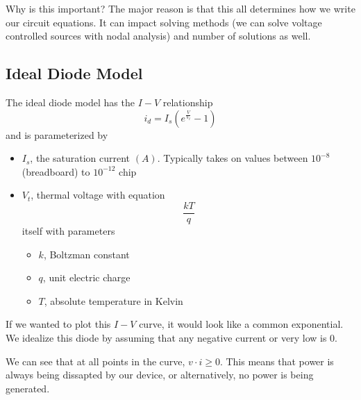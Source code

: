 \documentclass{report}
\begin{document}
Why is this important? The major reason is that this all determines how we write our circuit equations. It can impact solving methods (we can solve voltage controlled sources with nodal analysis) and number of solutions as well.

\subsection{Ideal Diode Model}
The ideal diode model has the $I-V$ relationship
\begin{equation*}
    i_d = I_s (e^{\frac{V}{V_t}} - 1)
\end{equation*}
and is parameterized by
\begin{itemize}
    \item $I_s$, the saturation current $(A)$. Typically takes on values between $10^{-8}$ (breadboard) to $10^{-12}$ chip
    \item $V_t$, thermal voltage with equation \begin{equation*}
        \frac{kT}{q}
    \end{equation*}
    itself with parameters \begin{itemize}
        \item $k$, Boltzman constant %
        \item $q$, unit electric charge %
        \item $T$, absolute temperature in Kelvin
    \end{itemize}
\end{itemize}
If we wanted to plot this $I-V$ curve, it would look like a common exponential. We idealize this diode by assuming that any negative current or very low is 0.

We can see that at all points in the curve, $v \cdot i \geq 0$. This means that power is always being dissapted by our device, or alternatively, no power is being generated.
\end{document}
